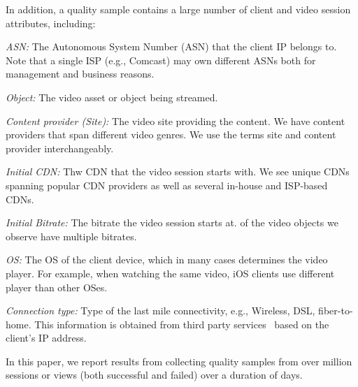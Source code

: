 
In addition, a quality sample contains a large number of client and
video session attributes, including:

\begin{packedenumerate}
\item \emph{ASN:} The Autonomous System Number (ASN) that the client
  IP belongs to. Note that a single ISP (e.g., Comcast) may own
  different ASNs both for management and business reasons.


\item \emph{Object:} The video asset or object being streamed.

\item \emph{Content provider (Site):} The video site providing the
  content. We have \fillme content providers that span different video
  genres.  We use the terms site and content provider interchangeably.

\item \emph{Initial CDN:} Thw CDN that the video session starts with.
  We see \fillme unique CDNs spanning popular CDN providers as well as
  several in-house and ISP-based CDNs. 

\item \emph{Initial Bitrate:} The bitrate the video session
  starts at. \fillme of the video objects we
  observe have multiple bitrates.

\item \emph{OS:} The OS of the client device, which in many cases
  determines the video player. For example, when watching the same
  video, iOS clients use different player than other OSes.

\item \emph{Connection type:} Type of the last mile connectivity,
  e.g., Wireless, DSL, fiber-to-home. This information is obtained
  from third party services~\cite{quova} based on the client's IP
  address.
\end{packedenumerate}

  In this paper, we report results from collecting quality samples
  from over \fillme million sessions or views (both successful and
  failed) over a duration of \fillme days.

